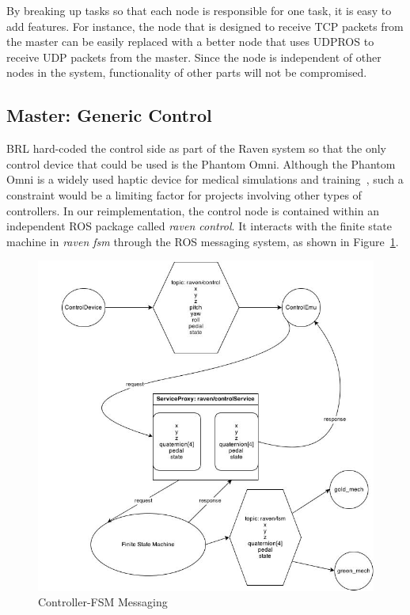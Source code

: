 \documentclass[letterpaper,twocolumn,10pt]{article}
\begin{document}
By breaking up tasks so that each node is responsible for one task, 
it is easy to add features. For instance, the node that is designed 
to receive TCP packets from the master can be easily replaced with 
a better node that uses UDPROS to receive UDP packets from the master. 
Since the node is independent of other nodes in the system, 
functionality of other parts will not be compromised.

\subsection{Master: Generic Control}

BRL hard-coded the control side as part of the Raven system so that
the only control device that could be used is the Phantom Omni. Although the
Phantom Omni is a widely used haptic device for medical simulations and
training~\cite{2}, such a constraint would be a limiting factor for projects
involving other types of controllers. In our reimplementation, the
control node is contained within an independent ROS package called
\emph{raven control}. It interacts with the finite state machine in
\emph{raven fsm} through the ROS messaging system, as shown in
Figure~\ref{fig:control_diagram}.

\begin{figure}[h]
  \includegraphics[width=1.0\columnwidth]{ControlDiagram.jpg}
  \caption{Controller-FSM Messaging}
  \label{fig:control_diagram}
\end{figure}
\end{document}
